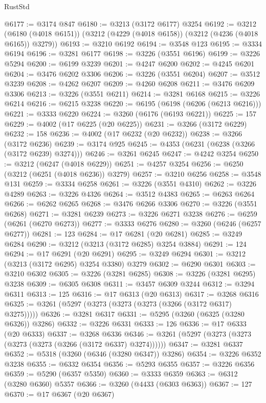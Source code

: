 \begin{lexlean}{RustStd}
\begin{coremodule}
{\begin{coremodule}
{{{{{{{{{{{{{{{{{{{{{{{{{{@6177 := @3174 @847
@6180 := @3213 (@3172 @6177) @3254
@6192 := @3212
    (@6180 (@4018 @6151))
    (@3212 (@4229 (@4018 @6158)) (@3212 (@4236 (@4018 @6165)) @3279))
@6193 := @3210 @6192
@6194 := @3548 @123
@6195 := @3334 @6194
@6196 := @3281 @6177
@6198 := @3226 (@3551 @6196)
@6199 := @3226 @5294
@6200 := @6199 @3239
@6201 := @4247 @6200
@6202 := @4245 @6201
@6204 := @3476 @6202 @3306
@6206 := @3226 (@3551 @6204)
@6207 := @3512 @3239
@6208 := @4262 @6207
@6209 := @4260 @6208
@6211 := @3476 @6209 @3306
@6213 := @3226 (@3551 @6211)
@6214 := @3281 @6168
@6215 := @3226 @6214
@6216 := @6215 @3238
@6220 := @6195 (@6198 (@6206 (@6213 @6216)))
@6221 := @3333 @6220
@6224 := @3260 (@6176 (@6193 @6221))
@6225 := 157
@6229 := @4002 (@17 @6225 (@20 @6225))
@6231 := @3266 (@3172 @6229)
@6232 := 158
@6236 := @4002 (@17 @6232 (@20 @6232))
@6238 := @3266 (@3172 @6236)
@6239 := @3174 @925
@6245 := @4353 (@6231 (@6238 (@3266 (@3172 @6239) @3274)))
@6246 := @3261 @6245
@6247 := @4242 @3254
@6250 := @3212 (@6247 (@4018 @6229))
@6251 := @4257 @3254
@6256 := @6250 (@3212 (@6251 (@4018 @6236)) @3279)
@6257 := @3210 @6256
@6258 := @3548 @131
@6259 := @3334 @6258
@6261 := @3226 (@3551 @4310)
@6262 := @3226 @4289
@6263 := @3226 @4326
@6264 := @3512 @4383
@6265 := @6263 @6264
@6266 := @6262 @6265
@6268 := @3476 @6266 @3306
@6270 := @3226 (@3551 @6268)
@6271 := @3281 @6239
@6273 := @3226 @6271 @3238
@6276 := @6259 (@6261 (@6270 @6273))
@6277 := @3333 @6276
@6280 := @3260 (@6246 (@6257 @6277))
@6281 := 123
@6284 := @17 @6281 (@20 @6281)
@6285 := @3249 @6284
@6290 := @3212 (@3213 (@3172 @6285) @3254 @3884)
@6291 := 124
@6294 := @17 @6291 (@20 @6291)
@6295 := @3249 @6294
@6301 := @3212 (@3213 (@3172 @6295) @3254 @3380) @3279
@6302 := @6290 @6301
@6303 := @3210 @6302
@6305 := @3226 (@3281 @6285)
@6308 := @3226 (@3281 @6295) @3238
@6309 := @6305 @6308
@6311 := @3457 @6309 @3244
@6312 := @3294 @6311
@6313 := 125
@6316 := @17 @6313 (@20 @6313)
@6317 := @3268 @6316
@6325 := @3261 (@5297 (@3273 (@3273 (@3273 (@3266 (@3172 @6317) @3275)))))
@6326 := @3281 @6317
@6331 := @5295 (@3260 (@6325 (@3280 @6326)) @3286)
@6332 := @3226 @6331
@6333 := 126
@6336 := @17 @6333 (@20 @6333)
@6337 := @3268 @6336
@6346 := @3261 (@5297 (@3273 (@3273 (@3273 (@3273 (@3266 (@3172 @6337) @3274))))))
@6347 := @3281 @6337
@6352 := @5318 (@3260 (@6346 (@3280 @6347)) @3286)
@6354 := @3226 @6352 @3238
@6355 := @6332 @6354
@6356 := @5293 @6355
@6357 := @3226 @6356
@6359 := @5290 (@6357 @5350)
@6360 := @3333 @6359
@6363 := @6312 (@3280 @6360) @5357
@6366 := @3260 (@4433 (@6303 @6363))
@6367 := 127
@6370 := @17 @6367 (@20 @6367)
}}}}}}}}}}}}}}}}}}}}}}}}}}
\end{coremodule}}
\end{coremodule}
\end{lexlean}
